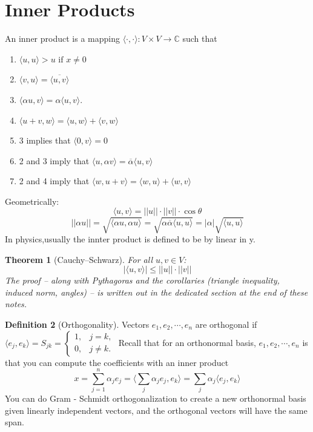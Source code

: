 \documentclass[11pt]{article}
\newcommand{\1}{\mathbf{1}}
\theoremstyle{notestyle}
\newtheorem{theorem}{Theorem}[section]
\theoremstyle{definition}
\newtheorem{definition}[theorem]{Definition}
\begin{document}
\section{Inner Products}
An inner product is a mapping
\(
\langle \cdot,\cdot\rangle : V\times V \to \mathbb{C}
\)
such that
\begin{enumerate}
    \item $\langle u, u\rangle > u \text{ if } x \ne 0$
    \item $\langle v, u\rangle = \overline{\langle u, v \rangle}$
    \item $\langle \alpha u, v\rangle = \alpha \langle u, v \rangle.$
    \item $\langle u + v, w\rangle = \langle u, w\rangle + \langle v, w\rangle$
    \item 3 implies that $\langle 0, v\rangle = 0$
    \item 2 and 3 imply that $\langle u, \alpha v\rangle = \overline{\alpha}\langle u,
        v\rangle$ 
    \item 2 and 4 imply that $\langle w, u + v \rangle = \langle w, u \rangle + \langle
        w, v\rangle$
\end{enumerate}
Geometrically: $$\langle u, v \rangle = ||u|| \cdot ||v|| \cdot \cos \theta$$
$$|| \alpha u || = \sqrt{\langle \alpha u, \alpha u \rangle } = \sqrt{\alpha
\overline{\alpha} \langle u, u\rangle} = |\alpha|\sqrt{\langle u, u \rangle}$$
In physics,usually the innter product is defined to be by linear in y. 
\begin{theorem}[Cauchy--Schwarz]
\label{thm:cauchy-schwarz}
For all $u, v \in V$:
$$|\langle u, v\rangle | \le ||u ||  \cdot ||v||$$
The proof -- along with Pythagoras and the corollaries (triangle inequality, induced
norm, angles) -- is written out in the dedicated section at the end of these notes.
\end{theorem}
\begin{definition}[Orthogonality]
\label{def:label}
Vectors $e_1, e_2, \cdots, e_n$ are orthogonal if $\langle e_j, e_k \rangle = S_{jk} =
\begin{cases}
1, & j=k,\\
0, & j\ne k.
\end{cases}$
Recall that for an orthonormal basis, $e_1, e_2, \cdots, e_n$
is that you can compute the coefficients with an inner product 
$$x = \sum_{j=1}^{n} \alpha_j e_j = \langle \sum_{j} \alpha_j e_j, e_k \rangle =
\sum_{j} \alpha_j \langle e_j, e_k \rangle$$
You can do Gram - Schmidt orthogonalization to create a new orthonormal basis given
linearly independent vectors, and the orthogonal vectors will have the same span.
\end{definition}
\end{document}

